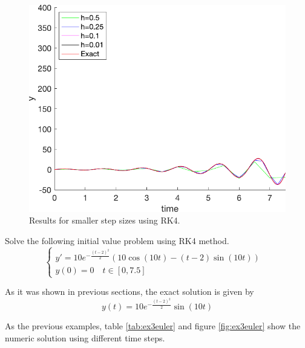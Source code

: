 \begin{figure}[H]
    \centering
    \includegraphics[scale=0.5]{files/example2Kutta.pdf}
    \caption{Results for smaller step sizes using RK4.}
    \label{fig:ex2kutta}
\end{figure}

\begin{exmp}
Solve the following initial value problem using RK4 method.
\begin{equation}
\begin{cases}
    y' = 10e^{-\frac{(t-2)^2}{2}}\left(10\cos(10t)-(t-2)\sin(10t)\right) &\\ y(0) = 0\quad t\in[0,7.5]&
\end{cases}
\end{equation}
\end{exmp}
As it was shown in previous sections, the exact solution is given by
\begin{equation}
    y(t) = 10e^{-\frac{(t-2)^2}{2}}\sin(10t)
\end{equation}


As the previous examples, table \ref{tab:ex3euler} and figure \ref{fig:ex3euler} show the numeric solution using different time steps.

